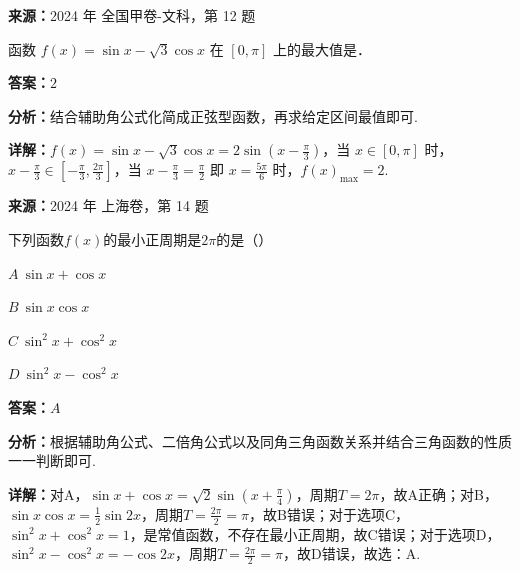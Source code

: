 \begin{question}[points=5]
\textbf{来源：}2024 年 全国甲卷-文科，第 12 题\par
函数 $f(x) = \sin x - \sqrt{3} \cos x$ 在 $[0, \pi]$ 上的最大值是．
\fillin[{$2$}]
\begin{solution}
\textbf{答案：}$2$

\textbf{分析：}结合辅助角公式化简成正弦型函数，再求给定区间最值即可.

\textbf{详解：}$f(x) = \sin x - \sqrt{3} \cos x = 2\sin\left(x - \frac{\pi}{3}\right)$，当 $x \in [0, \pi]$ 时，$x - \frac{\pi}{3} \in [-\frac{\pi}{3}, \frac{2\pi}{3}]$，当 $x - \frac{\pi}{3} = \frac{\pi}{2}$ 即 $x = \frac{5\pi}{6}$ 时，$f(x)_{\max} = 2$.
\end{solution}
\end{question}

\begin{question}[points=4]
\textbf{来源：}2024 年 上海卷，第 14 题\par
下列函数$f(x)$的最小正周期是$2\pi$的是（\quad\quad）
\begin{choices}
  \item $A\ \sin x+\cos x$
  \item $B\ \sin x\cos x$
  \item $C\ \sin^2x+\cos^2x$
  \item $D\ \sin^2x-\cos^2x$
\end{choices}
\begin{solution}
\textbf{答案：}$A$

\textbf{分析：}根据辅助角公式、二倍角公式以及同角三角函数关系并结合三角函数的性质一一判断即可.

\textbf{详解：}对A，$\sin x+\cos x=\sqrt{2}\sin\left(x+\frac{\pi}{4}\right)$，周期$T=2\pi$，故A正确；对B，$\sin x\cos x=\frac{1}{2}\sin2x$，周期$T=\frac{2\pi}{2}=\pi$，故B错误；对于选项C，$\sin^2x+\cos^2x=1$，是常值函数，不存在最小正周期，故C错误；对于选项D，$\sin^2x-\cos^2x=-\cos2x$，周期$T=\frac{2\pi}{2}=\pi$，故D错误，故选：A.
\end{solution}
\end{question}

